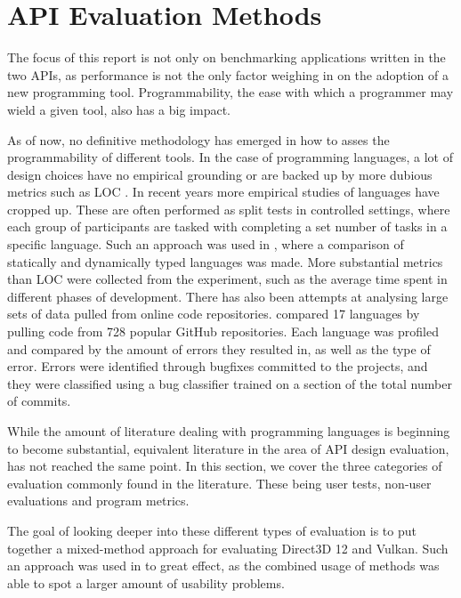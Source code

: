 \section{\gls{API} Evaluation Methods}\label{sec:apimethods}
The focus of this report is not only on benchmarking applications written in the two \glspl{API}, as performance is not the only factor weighing in on the adoption of a new programming tool.
Programmability, the ease with which a programmer may wield a given tool, also has a big impact.

As of now, no definitive methodology has emerged in how to asses the programmability of different tools.
In the case of programming languages, a lot of design choices have no empirical grounding or are backed up by more dubious metrics such as \gls{LOC} \cite{markstrum2010staking}.
In recent years more empirical studies of languages have cropped up.
These are often performed as split tests in controlled settings, where each group of participants are tasked with completing a set number of tasks in a specific language.
Such an approach was used in \citet{hanenberg2010experiment}, where a comparison of statically and dynamically typed languages was made.
More substantial metrics than \gls{LOC} were collected from the experiment, such as the average time spent in different phases of development.
There has also been attempts at analysing large sets of data pulled from online code repositories.
\citet{ray2014large} compared 17 languages by pulling code from 728 popular GitHub repositories.
Each language was profiled and compared by the amount of errors they resulted in, as well as the type of error.
Errors were identified through bugfixes committed to the projects, and they were classified using a bug classifier trained on a section of the total number of commits. 

While the amount of literature dealing with programming languages is beginning to become substantial, equivalent literature in the area of \gls{API} design evaluation, has not reached the same point.
In this section, we cover the three categories of evaluation commonly found in the literature.
These being user tests, non-user evaluations and program metrics.     

The goal of looking deeper into these different types of evaluation is to put together a mixed-method approach for evaluating Direct3D 12 and Vulkan.
Such an approach was used in \citet{grill2012methods, beaton2008usability} to great effect, as the combined usage of methods was able to spot a larger amount of usability problems.

